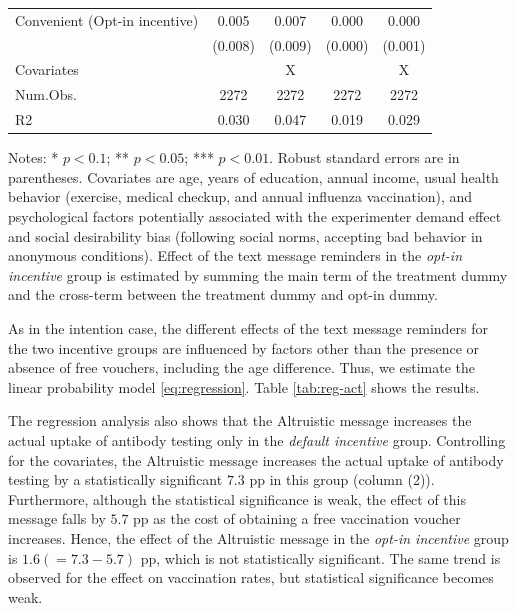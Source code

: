 \documentclass[
  11pt,
  a4paper
]{article}
\begin{document}
\begin{table}
\begin{threeparttable}
\begin{tabular}[t]{lcccc}
\hspace{1em}Convenient (Opt-in incentive) & \num{0.005} & \num{0.007} & \num{0.000} & \num{0.000}\\
\hspace{1em} & (\num{0.008}) & (\num{0.009}) & (\num{0.000}) & (\num{0.001})\\
\midrule
Covariates &  & X &  & X\\
Num.Obs. & \num{2272} & \num{2272} & \num{2272} & \num{2272}\\
R2 & \num{0.030} & \num{0.047} & \num{0.019} & \num{0.029}\\
\bottomrule
\end{tabular}
\begin{tablenotes}
\item Notes: * $p < 0.1$; ** $p < 0.05$; *** $p < 0.01$. Robust standard errors are in parentheses. Covariates are age, years of education, annual income, usual health behavior (exercise, medical checkup, and annual influenza vaccination), and psychological factors potentially associated with the experimenter demand effect and social desirability bias (following social norms, accepting bad behavior in anonymous conditions). Effect of the text message reminders in the \emph{opt-in incentive} group is estimated by summing the main term of the treatment dummy and the cross-term between the treatment dummy and opt-in dummy.
\end{tablenotes}
\end{threeparttable}
\end{table}

As in the intention case, the different effects of the text message reminders for the two incentive groups are influenced by factors other than the presence or absence of free vouchers, including the age difference. Thus, we estimate the linear probability model \eqref{eq:regression}. Table \ref{tab:reg-act} shows the results.

The regression analysis also shows that the Altruistic message increases the actual uptake of antibody testing only in the \emph{default incentive} group. Controlling for the covariates, the Altruistic message increases the actual uptake of antibody testing by a statistically significant \(7.3\) pp in this group (column (2)). Furthermore, although the statistical significance is weak, the effect of this message falls by \(5.7\) pp as the cost of obtaining a free vaccination voucher increases. Hence, the effect of the Altruistic message in the \emph{opt-in incentive} group is \(1.6 (=7.3-5.7)\) pp, which is not statistically significant. The same trend is observed for the effect on vaccination rates, but statistical significance becomes weak.
\end{document}
